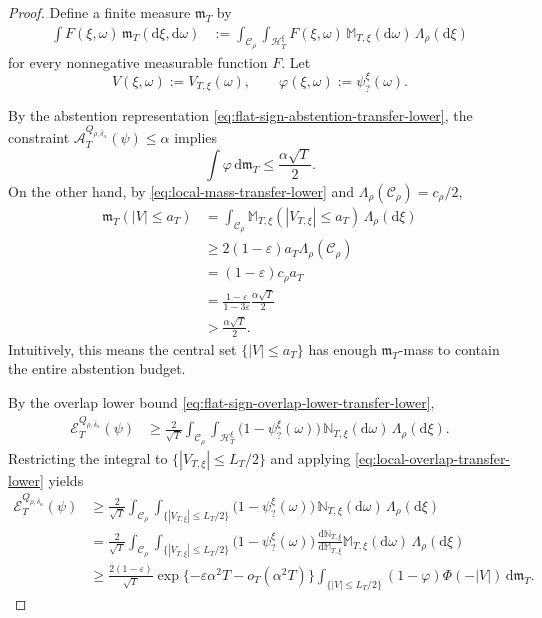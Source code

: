 \documentclass[10pt]{article}
\newcommand{\dd}{\mathrm{d}}
\theoremstyle{plain}
\begin{document}
\begin{proof}
Define a finite measure $\mathfrak m_T$ by
\[
\begin{aligned}
    \int F(\xi,\omega)\,
    \mathfrak m_T(\dd\xi,\dd\omega)
    &:=
    \int_{\mathcal C_\rho}
    \int_{\mathcal H_T^\xi}
        F(\xi,\omega)
    \,\mathbb M_{T,\xi}(\dd\omega)\,
    \Lambda_\rho(\dd\xi)
\end{aligned}
\]
for every nonnegative measurable function $F$. Let
\[
    V(\xi,\omega)
    :=
    V_{T,\xi}(\omega),
    \qquad
    \varphi(\xi,\omega)
    :=
    \psi_?^\xi(\omega).
\]

By the abstention representation
\eqref{eq:flat-sign-abstention-transfer-lower}, the constraint
$\mathcal A_T^{Q_{\rho,\bar\delta_\alpha}}(\psi)\le\alpha$ implies
\[
    \int
        \varphi
    \,\dd\mathfrak m_T
    \le
    \frac{\alpha\sqrt T}{2}.
\]
On the other hand, by
\eqref{eq:local-mass-transfer-lower} and
$\Lambda_\rho(\mathcal C_\rho)=c_\rho/2$,
\[
\begin{aligned}
    \mathfrak m_T(|V|\le a_T)
    &=
    \int_{\mathcal C_\rho}
        \mathbb M_{T,\xi}
        \left(
            |V_{T,\xi}|\le a_T
        \right)
    \,\Lambda_\rho(\dd\xi)\\
    &\ge
    2(1-\varepsilon)a_T
    \Lambda_\rho(\mathcal C_\rho)\\
    &=
    (1-\varepsilon)c_\rho a_T\\
    &=
    \frac{1-\varepsilon}{1-3\varepsilon}
    \frac{\alpha\sqrt T}{2}\\
    &>
    \frac{\alpha\sqrt T}{2}.
\end{aligned}
\]
Intuitively, this means the central set $\{|V|\le a_T\}$ has enough
$\mathfrak m_T$-mass to contain the entire abstention budget.

By the overlap lower bound
\eqref{eq:flat-sign-overlap-lower-transfer-lower},
\[
\begin{aligned}
    \mathcal E_T^{Q_{\rho,\bar\delta_\alpha}}(\psi)
    &\ge
    \frac{2}{\sqrt T}
    \int_{\mathcal C_\rho}
    \int_{\mathcal H_T^\xi}
        \bigl(1-\psi_?^\xi(\omega)\bigr)
    \,\mathbb N_{T,\xi}(\dd\omega)\,
    \Lambda_\rho(\dd\xi).
\end{aligned}
\]
Restricting the integral to
$\{|V_{T,\xi}|\le L_T/2\}$ and applying
\eqref{eq:local-overlap-transfer-lower} yields
\[
\begin{aligned}
    \mathcal E_T^{Q_{\rho,\bar\delta_\alpha}}(\psi)
    &\ge
    \frac{2}{\sqrt T}
    \int_{\mathcal C_\rho}
    \int_{\{|V_{T,\xi}|\le L_T/2\}}
        \bigl(1-\psi_?^\xi(\omega)\bigr)
    \,\mathbb N_{T,\xi}(\dd\omega)\,
    \Lambda_\rho(\dd\xi) \\
    &= \frac{2}{\sqrt T}
    \int_{\mathcal C_\rho}
    \int_{\{|V_{T,\xi}|\le L_T/2\}}
        \bigl(1-\psi_?^\xi(\omega)\bigr)
    \,\frac{\dd\mathbb N_{T,\xi}}{\dd\mathbb M_{T,\xi}}\mathbb M_{T,\xi}(\dd\omega)\,
    \Lambda_\rho(\dd\xi) \\
    &\ge
    \frac{2(1-\varepsilon)}{\sqrt T}
    \exp\{
        -\varepsilon\alpha^2T
        -o_T(\alpha^2T)
    \}
    \int_{\{|V|\le L_T/2\}}
        (1-\varphi)
        \Phi(-|V|)
    \,\dd\mathfrak m_T.
\end{aligned}
\]


\end{proof}
\end{document}
